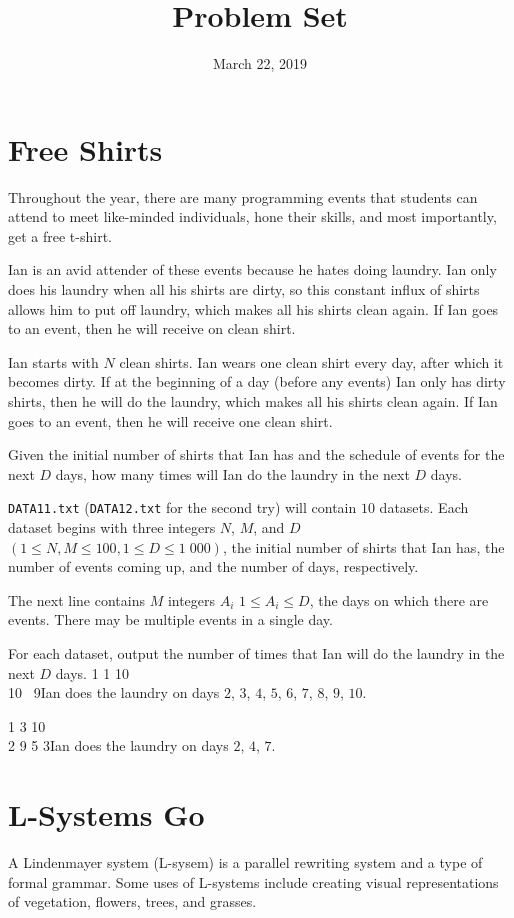 \documentclass{problem-set}
\title{Problem Set}
\date{March 22, 2019}
\begin{document}
\maketitle

\section{Free Shirts}
Throughout the year, there are many programming events that students can attend to meet like-minded individuals, hone their skills, and most importantly, get a free t-shirt.

Ian is an avid attender of these events because he hates doing laundry. Ian only does his laundry when all his shirts are dirty, so this constant influx of shirts allows him to put off laundry, which makes all his shirts clean again. If Ian goes to an event, then he will receive on clean shirt.

Ian starts with $N$ clean shirts. Ian wears one clean shirt every day, after which it becomes dirty. If at the beginning of a day (before any events) Ian only has dirty shirts, then he will do the laundry, which makes all his shirts clean again. If Ian goes to an event, then he will receive one clean shirt.

Given the initial number of shirts that Ian has and the schedule of events for the next $D$ days, how many times will Ian do the laundry in the next $D$ days.

\texttt{DATA11.txt} (\texttt{DATA12.txt} for the second try) will contain $10$ datasets. Each dataset begins with three integers $N$, $M$, and $D$ $(1 \leq N, M \leq 100, 1 \leq D \leq 1\;000)$, the initial number of shirts that Ian has, the number of events coming up, and the number of days, respectively.

The next line contains $M$ integers $A_i$ $1 \leq A_i \leq D$, the days on which there are events. There may be multiple events in a single day.

\outputformat
For each dataset, output the number of times that Ian will do the laundry in the next $D$ days.
\pushnewpage
\addsampleExplanation
{
1 1 10\\
10\
}
{9}{Ian does the laundry on days $2$, $3$, $4$, $5$, $6$, $7$, $8$, $9$, $10$.}

\addsampleExplanation
{
1 3 10\\
2 9 5
}{3}{Ian does the laundry on days $2$, $4$, $7$.}

\newpage
\section{L-Systems Go}
A Lindenmayer system (L-sysem) is a parallel rewriting system and a type of formal grammar. Some uses of L-systems include creating visual representations of vegetation, flowers, trees, and grasses.
\end{document}
